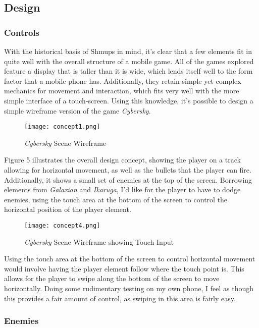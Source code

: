 \documentclass{scrartcl}
\begin{document}
\subsection{Design}

\subsubsection{Controls}

With the historical basis of Shmups in mind, it's clear that a few elements fit in quite well with the overall structure of a mobile game. All of the games explored feature a display that is taller than it is wide, which lends itself well to the form factor that a mobile phone has. Additionally, they retain simple-yet-complex mechanics for movement and interaction, which fits very well with the more simple interface of a touch-screen. Using this knowledge, it's possible to design a simple wireframe version of the game \textit{Cybersky}.

\begin{figure}[ht]
  \centering
  \texttt{[image: concept1.png]}
  \caption[\textit{Cybersky}]{\textit{Cybersky} Scene Wireframe}
\end{figure}

Figure 5 illustrates the overall design concept, showing the player on a track allowing for horizontal movement, as well as the bullets that the player can fire. Additionally, it shows a small set of enemies at the top of the screen. Borrowing elements from \textit{Galaxian} and \textit{Ikaruga}, I'd like for the player to have to dodge enemies, using the touch area at the bottom of the screen to control the horizontal position of the player element.

\begin{figure}[ht]
  \centering
  \texttt{[image: concept4.png]}
  \caption[\textit{Cybersky}]{\textit{Cybersky} Scene Wireframe showing Touch Input}
\end{figure}

Using the touch area at the bottom of the screen to control horizontal movement would involve having the player element follow where the touch point is. This allows for the player to swipe along the bottom of the screen to move horizontally. Doing some rudimentary testing on my own phone, I feel as though this provides a fair amount of control, as swiping in this area is fairly easy.

\subsubsection{Enemies}
\end{document}
